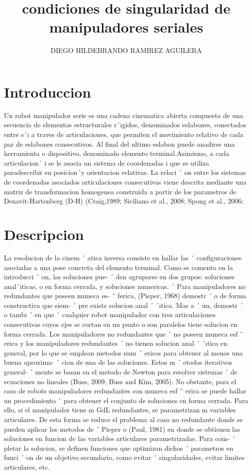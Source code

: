 \documentclass[12pt,a4paper]{article}
\author{DIEGO HILDEBRANDO RAMIREZ AGUILERA}
\title{condiciones de singularidad de manipuladores seriales}
\begin{document}
\maketitle
\section{Introduccion}
Un robot manipulador serie es una cadena cinematica abierta compuesta de una secuencia de elementos estructurales r´ıgidos, denominados eslabones, conectados entre s´ı a traves de articulaciones, que permiten el movimiento relativo de cada par
de eslabones consecutivos. Al final del ultimo eslabon puede anadirse una herramienta o dispositivo, denominado elemento terminal.Asimismo, a cada articulacion´ i se le asocia un sistema de coordenadas {i} que se utiliza paradescribir su posicion´y orientacion relativas. La relaci ´ on entre los sistemas de coordenadas asociados articulaciones consecutivas viene descrita
mediante una matriz de transformacion homogenea construida a partir de los parametros de Denavit-Hartenberg (D-H) (Craig,1989; Siciliano et al., 2008; Spong et al., 2006; 
\section{Descripcion}
La resolucion de la cinem ´ atica inversa consiste en hallar las ´
configuraciones asociadas a una pose concreta del elemento terminal. Como se comento en la introducci ´ on, las soluciones pue- ´
den agruparse en dos grupos: soluciones anal´ıticas, o en forma
cerrada, y soluciones numericas. ´
Para manipuladores no redundantes que poseen muneca es- ˜
ferica, (Pieper, 1968) demostr ´ o de forma constructiva que siem- ´
pre existe solucion anal ´ ´ıtica. Mas a ´ un, demostr ´ o tambi ´ en que ´
cualquier robot manipulador con tres articulaciones consecutivas cuyos ejes se cortan en un punto o son paralelos tiene solucion en forma cerrada. Los manipuladores no redundantes que ´
no poseen muneca esf ˜ erica y los manipuladores redundantes ´
no tienen solucion anal ´ ´ıtica en general, por lo que se emplean
metodos num ´ ericos para obtener al menos una buena aproxima- ´
cion de una de las soluciones. Estos m ´ etodos iterativos general- ´
mente se basan en el metodo de Newton para resolver sistemas ´
de ecuaciones no lineales (Buss, 2009; Buss and Kim, 2005).
No obstante, para el caso de robots manipuladores redundantes con muneca esf ˜ erica se puede hallar un procedimiento ´
para obtener el conjunto de soluciones en forma cerrada. Para
ello, si el manipulador tiene m GdL redundantes, se parametrizan m variables articulares. De esta forma se reduce el problema
al caso no redundante donde se pueden aplicar los metodos de ´
Pieper o (Paul, 1981) en donde se obtienen las soluciones en
funcion de las variables articulares parametrizadas. Para com- ´
pletar la solucion, se definen funciones que optimizan dichos ´
parametros en funci ´ on de un objetivo secundario, como evitar ´
singularidades, evitar limites articulares, etc.
\end{document}
